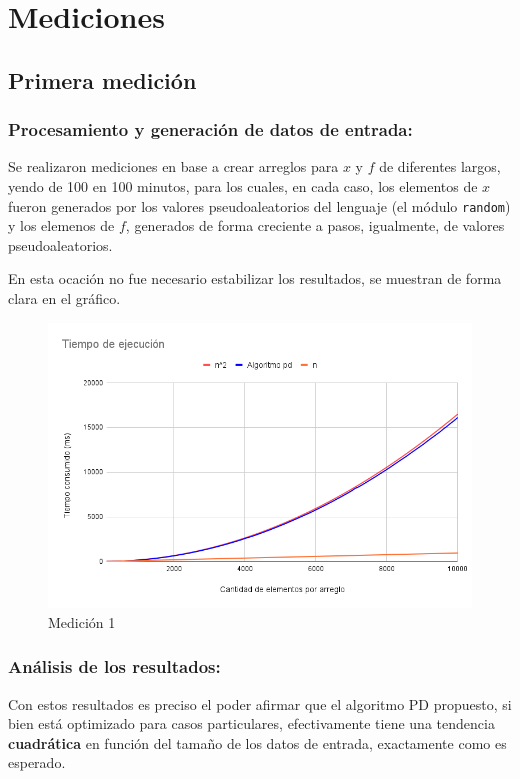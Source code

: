 \section{Mediciones}\label{sec:mediciones}

\subsection{Primera medición}\label{subsec:medicion1}
\subsubsection{Procesamiento y generación de datos de entrada:} 
Se realizaron mediciones en base a crear arreglos para $x$ y $f$ de diferentes largos, yendo de 100 en 100 minutos, para los cuales, en cada caso, los elementos de $x$ fueron generados por los valores pseudoaleatorios del lenguaje (el módulo \texttt{random}) y los elemenos de $f$, generados de forma creciente a pasos, igualmente, de valores pseudoaleatorios. 

En esta ocación no fue necesario estabilizar los resultados, se muestran de forma clara en el gráfico.

\begin{figure}[H]
    \centering
    \includegraphics[width=1\textwidth]{img/tiempos_10k_100.png}
    \caption{Medición 1}
\end{figure}

\subsubsection{Análisis de los resultados:}
Con estos resultados es preciso el poder afirmar que el algoritmo PD propuesto, si bien está optimizado para casos particulares, efectivamente tiene una tendencia \textbf{cuadrática} en función del tamaño de los datos de entrada, exactamente como es esperado.
\newpage

